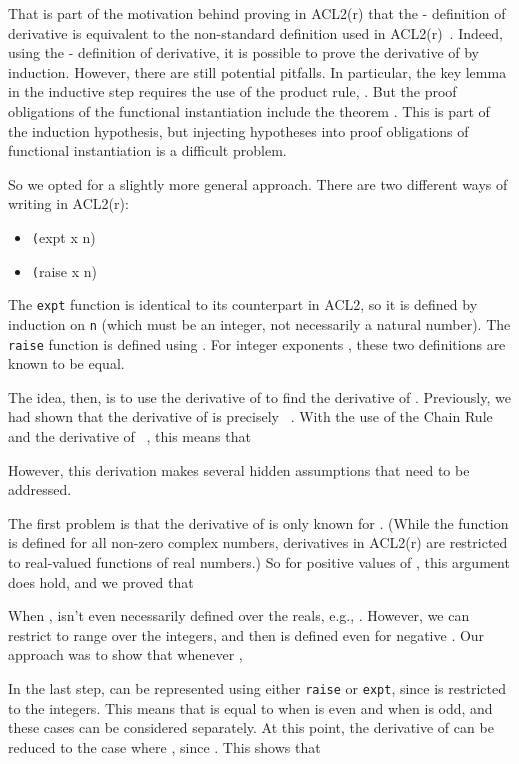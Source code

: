 \documentclass[copyright,creativecommons]{eptcs}
\begin{document}
That is part of the motivation behind proving in ACL2(r) that the
- definition of derivative is equivalent to the
non-standard definition used in ACL2(r)~\cite{CoGa:equivalences}.  
Indeed, using the - definition of derivative, it is
possible to prove the derivative of  by induction. However, there
are still potential pitfalls. In particular, the key lemma in the
inductive step requires the use of the product rule, .  But the proof obligations of the
functional instantiation include the theorem . This is part of the induction hypothesis, but
injecting hypotheses into proof obligations of functional
instantiation is a difficult problem.

So we opted for a slightly more general approach.  There are two
different ways of writing  in ACL2(r):
\begin{itemize}
\item \texttt(expt x n)
\item \texttt(raise x n)
\end{itemize}
The \texttt{expt} function is identical to its counterpart in ACL2, so
it is defined by induction on \texttt{n} (which must be an integer, not
necessarily a natural number). The \texttt{raise} function is defined
using . For integer exponents , these two
definitions are known to be equal.

The idea, then, is to use the derivative of  to find
the derivative of . Previously, we had shown that the derivative
of  is precisely ~\cite{ReGa:automatic-differentiator}. With
the use of the Chain Rule~\cite{GaCo:chain-rule} and the derivative of
~\cite{ReGa:automatic-differentiator}, this means that

However, this derivation makes several hidden assumptions that need to
be addressed.

The first problem is that the derivative of  is only known for
.  (While the function  is defined for all non-zero
complex numbers, derivatives in ACL2(r) are restricted to real-valued
functions of real numbers.) So for positive values of , this
argument does hold, and we proved that


When ,  isn't even necessarily defined over the
reals, e.g., . However, we can restrict  to range over the integers,
and then  is defined even for negative . Our approach was to
show that whenever , 

In the last step,  can be represented using either
\texttt{raise} or \texttt{expt}, since  is restricted to the
integers. This means that  is equal to  when  is even
and  when  is odd, and these cases can be considered
separately. At this point, the derivative of  can be reduced to
the case where , since . This shows that 
\end{document}
